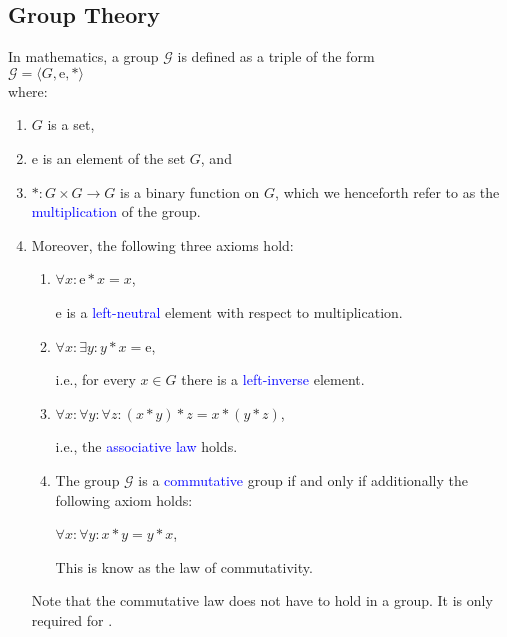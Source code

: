 \subsection{Group Theory}
In mathematics, a group $\mathcal{G}$  is defined as a triple of the form
\\[0.2cm]
\hspace*{1.3cm}
$\mathcal{G} = \langle G, \mathrm{e}, * \rangle$
\\[0.2cm]
where:
\begin{enumerate}
\item $G$ is a set,
\item $\mathrm{e}$ is an element of the set $G$, and
\item $*: G \times G \rightarrow G$ is a binary function on $G$, which we henceforth refer to as the
      \textcolor{blue}{multiplication} of the group.
\item Moreover, the following three axioms hold:
      \begin{enumerate}
      \item $\forall x: \mathrm{e} * x = x$,
        
            $\mathrm{e}$ is a \textcolor{blue}{left-neutral} element with respect to multiplication.
      \item $\forall x: \exists{y}: y * x = \mathrm{e}$,

            i.e., for every $x \in G$ there is a \textcolor{blue}{left-inverse} element.
      \item $\forall x: \forall y: \forall z: (x * y) * z = x * (y * z)$,

            i.e., the \textcolor{blue}{associative law} holds.

      \item The group $\mathcal{G}$ is a \textcolor{blue}{commutative} group if and only if additionally the
            following axiom holds: 
        
            $\forall x: \forall y: x * y = y * x$,

            This is know as the law of commutativity.
            \eox
      \end{enumerate}
      Note that the commutative law does not have to hold in a group.  It is only required for
      . 
\end{enumerate}

